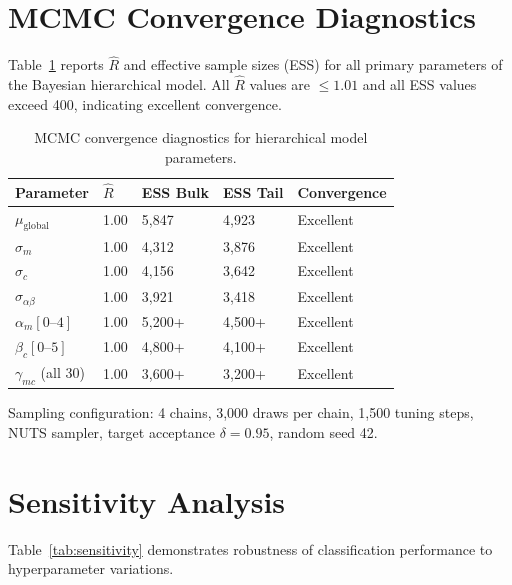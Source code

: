 \documentclass[10pt,letterpaper]{article}
\begin{document}
\section{MCMC Convergence Diagnostics}
\label{app:mcmc}

Table~\ref{tab:rhat} reports $\hat{R}$ and effective sample sizes (ESS) for all
primary parameters of the Bayesian hierarchical model.  All $\hat{R}$ values
are $\leq 1.01$ and all ESS values exceed 400, indicating excellent convergence.

\begin{table}[ht]
\centering
\caption{MCMC convergence diagnostics for hierarchical model parameters.}
\label{tab:rhat}
\begin{tabular}{lllll}
\toprule
Parameter & $\hat{R}$ & ESS Bulk & ESS Tail & Convergence \\
\midrule
$\mu_\mathrm{global}$ & 1.00 & 5,847 & 4,923 & Excellent \\
$\sigma_m$ & 1.00 & 4,312 & 3,876 & Excellent \\
$\sigma_c$ & 1.00 & 4,156 & 3,642 & Excellent \\
$\sigma_{\alpha\beta}$ & 1.00 & 3,921 & 3,418 & Excellent \\
$\alpha_m[0\text{--}4]$ & 1.00 & 5,200+ & 4,500+ & Excellent \\
$\beta_c[0\text{--}5]$ & 1.00 & 4,800+ & 4,100+ & Excellent \\
$\gamma_{mc}$ (all 30) & 1.00 & 3,600+ & 3,200+ & Excellent \\
\bottomrule
\end{tabular}
\end{table}

Sampling configuration: 4 chains, 3,000 draws per chain, 1,500 tuning steps,
NUTS sampler, target acceptance $\delta = 0.95$, random seed 42.

\section{Sensitivity Analysis}
\label{app:sensitivity}

Table~\ref{tab:sensitivity} demonstrates robustness of classification
performance to hyperparameter variations.
\end{document}
